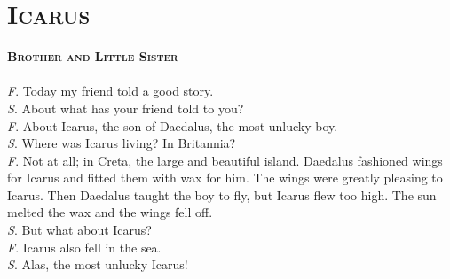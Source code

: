 \documentclass[12pt]{article}
\begin{document}
\section{\textsc{Icarus}}
\textsc{\textbf{Brother and Little Sister}} \\ \\
\textsc{\textit{F}}. Today my friend told a good story. \\
\textsc{\textit{S}}. About what has your friend told to you? \\
\textsc{\textit{F}}. About Icarus, the son of Daedalus, the most unlucky boy. \\
\textsc{\textit{S}}. Where was Icarus living? In Britannia? \\
\textsc{\textit{F}}. Not at all; in Creta, the large and beautiful island. Daedalus fashioned wings for Icarus and fitted them with wax for him. The wings were greatly pleasing to Icarus. Then Daedalus taught the boy to fly, but Icarus flew too high. The sun melted the wax and the wings fell off. \\
\textsc{\textit{S}}. But what about Icarus? \\
\textsc{\textit{F}}. Icarus also fell in the sea. \\
\textsc{\textit{S}}. Alas, the most unlucky Icarus!
\end{document}
